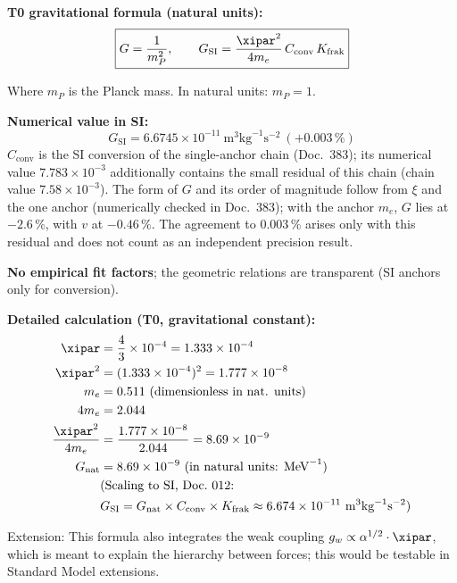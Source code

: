 	\begin{vorteil}
		\textbf{T0 gravitational formula (natural units):}
		\begin{equation}
			\boxed{G = \frac{1}{m_P^2}, \qquad G_{\text{SI}} = \frac{\xipar^2}{4m_e}\,C_{\text{conv}}\,K_{\text{frak}}}
		\end{equation}
		
		Where $m_P$ is the Planck mass. In natural units: $m_P = 1$.
		
		\textbf{Numerical value in SI:}
		\begin{equation}
			\boxed{G_{\text{SI}} = 6.6745 \times 10^{-11}\ \text{m}^3\text{kg}^{-1}\text{s}^{-2}\ (+0.003\,\%)}
		\end{equation}
		$C_{\text{conv}}$ is the SI conversion of the single-anchor chain (Doc.~383); its numerical value $7.783\times10^{-3}$ additionally contains the small residual of this chain (chain value $7.58\times10^{-3}$). The form of $G$ and its order of magnitude follow from $\xi$ and the one anchor (numerically checked in Doc.~383); with the anchor $m_e$, $G$ lies at $-2.6\,\%$, with $v$ at $-0.46\,\%$. The agreement to $0.003\,\%$ arises only with this residual and does not count as an independent precision result.
		
		\textbf{No empirical fit factors}; the geometric relations are transparent (SI anchors only for conversion).
		
		\textbf{Detailed calculation (T0, gravitational constant):}
		\begin{align}
			\xipar &= \frac{4}{3} \times 10^{-4} = 1.333 \times 10^{-4} \\
			\xipar^2 &= (1.333 \times 10^{-4})^2 = 1.777 \times 10^{-8} \\
			m_e &= 0.511 \text{ (dimensionless in nat. units)} \\
			4 m_e &= 2.044 \\
			\frac{\xipar^2}{4 m_e} &= \frac{1.777 \times 10^{-8}}{2.044} = 8.69 \times 10^{-9} \\
			G_{\text{nat}} &= 8.69 \times 10^{-9} \text{ (in natural units: MeV}^{-1}\text{)} \\
			&\text{(Scaling to SI, Doc.~012: } \\ 
			&G_{\text{SI}} = G_{\text{nat}} \times C_{\text{conv}} \times K_{\text{frak}} \approx 6.674 \times 10^{-11} \text{ m}^3 \text{kg}^{-1} \text{s}^{-2}\text{)}
		\end{align}
		
		Extension: This formula also integrates the weak coupling $g_w \propto \alpha^{1/2} \cdot \xipar$, which is meant to explain the hierarchy between forces; this would be testable in Standard Model extensions.
	\end{vorteil}
	
